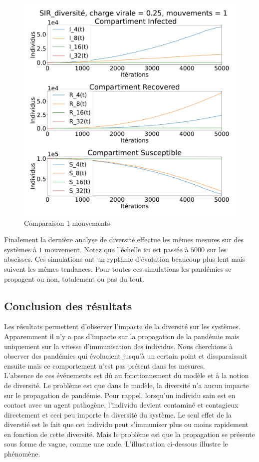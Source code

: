 \begin{figure}[h]
	\includegraphics[width=.4\textwidth]{Images/SIR_diversite_025_1.pdf}
	\caption{Comparaison 1 mouvements}
\end{figure}

Finalement la dernière analyse de diversité effectue les mêmes mesures sur des systèmes à $1$ mouvement. Notez que l'échelle ici est passée à $5000$ sur les abscisses. Ces simulations ont un rypthme d'évolution beaucoup plus lent mais suivent les mêmes tendances. Pour toutes ces simulations les pandémies se propagent ou non, totalement ou pas du tout.

\subsection{Conclusion des résultats}

Les résultats permettent d'observer l'impacte de la diversité sur les systèmes. Apparemment il n'y a pas d'impacte sur la propagation de la pandémie mais uniquement sur la vitesse d'immunisation des individus. Nous cherchions à observer des pandémies qui évoluaient jusqu'à un certain point et dissparaissait ensuite mais ce comportement n'est pas présent dans les mesures.\\

L'absence de ces événements est dû au fonctionnement du modèle et à la notion de diversité. Le problème est que dans le modèle, la diversité n'a aucun impacte sur le propagation de pandémie. Pour rappel, lorsqu'un individu sain est en contact avec un agent pathogène, l'individu devient contaminé et contagieux directement et ceci peu importe la diversité du système. Le seul effet de la diverstié est le fait que cet individu peut s'immuniser plus ou moins rapidement en fonction de cette diversité. Mais le problème est que la propagation se présente sous forme de vague, comme une onde. L'illustration ci-dessous illustre le phénomène.

